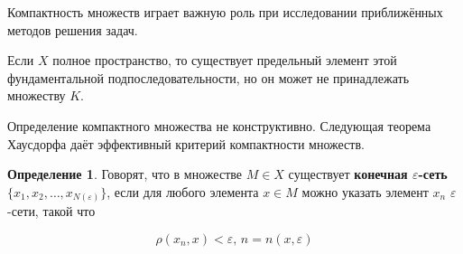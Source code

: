 \documentclass[12pt,a4paper,titlepage,oneside]{book}
\theoremstyle{definition}
\newtheorem*{definition}{Определение}
\theoremstyle{plain}
\theoremstyle{remark}
\theoremstyle{remark}
\theoremstyle{remark}
\theoremstyle{remark}
\theoremstyle{plain}
\theoremstyle{plain}
\begin{document}
Компактность множеств играет важную роль при исследовании приближённых методов решения задач.

Если $X$ полное пространство, то существует предельный элемент этой фундаментальной подпоследовательности, но он может не принадлежать множеству $K$.

Определение компактного множества не конструктивно. Следующая теорема Хаусдорфа даёт эффективный критерий компактности множеств.

\begin{definition}
Говорят, что в множестве $M \in X$ существует \textbf{конечная $\varepsilon$-сеть $\lbrace x_1,x_2,\ldots,x_{N(\varepsilon)} \rbrace$}, если для любого элемента $x \in M$ можно указать элемент $x_n$ $\varepsilon$-сети, такой что

\begin{equation*}
\rho(x_n, x) < \varepsilon \mbox{, } n=n(x,\varepsilon)
\end{equation*}

\end{definition}
\end{document}

